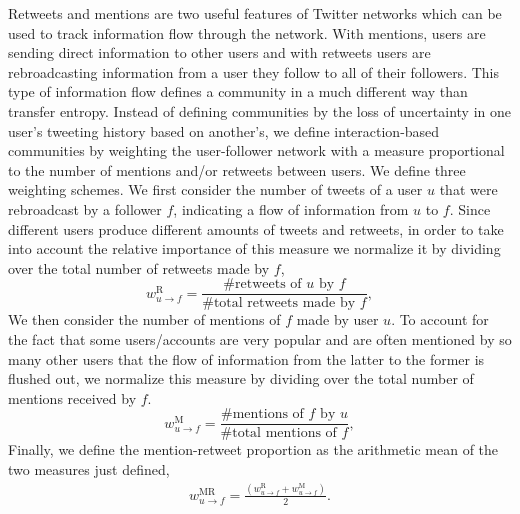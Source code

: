 \documentclass[10pt,letterpaper]{article}
\begin{document}
Retweets and mentions are two useful features of Twitter networks which can be used to track information flow through the network.
With mentions, users are sending direct information to other users and with retweets users are rebroadcasting information from a user they follow to all of their followers.
This type of information flow defines a community in a much different way than transfer entropy. Instead of defining communities by the loss of uncertainty in one user's tweeting history based on another's, we define interaction-based communities by weighting the user-follower network with a measure proportional to the number of mentions and/or retweets between users. 
We define three weighting schemes. We first consider the number of tweets of a user $u$ that were rebroadcast by a follower $f$, indicating a flow of information from $u$ to $f$. Since different users produce different amounts of tweets and retweets, in order to take into account the relative importance of this measure we normalize it by dividing over the total number of retweets made by $f$,
\begin{equation}
w_{u \to f}^{\text{R}}=\frac{\mbox{\# retweets of }u \mbox{ by }f}{\mbox{\# total retweets made by }f},
\end{equation}
We then consider the number of mentions of $f$ made by user $u$. To account for the fact that some users/accounts are very popular and are often mentioned by so many other users that the flow of information from the latter to the former is flushed out, we normalize this measure by dividing over the total number of mentions received by $f$.
\begin{equation}
w_{u \to f}^{\text{M}} = \frac{\mbox{\# mentions of }f \mbox{ by }u}{\mbox{\# total mentions of }f},
\end{equation}
Finally, we define the mention-retweet proportion as the arithmetic mean of the two measures just defined,
\begin{align}
	w_{u \to f}^{\text{MR}} = \frac{(w_{u \to f}^{\text{R}}+w_{u \to f}^{\text{M}})}{2}. \label{Eqn-EW-interaction}
\end{align} 
\end{document}
